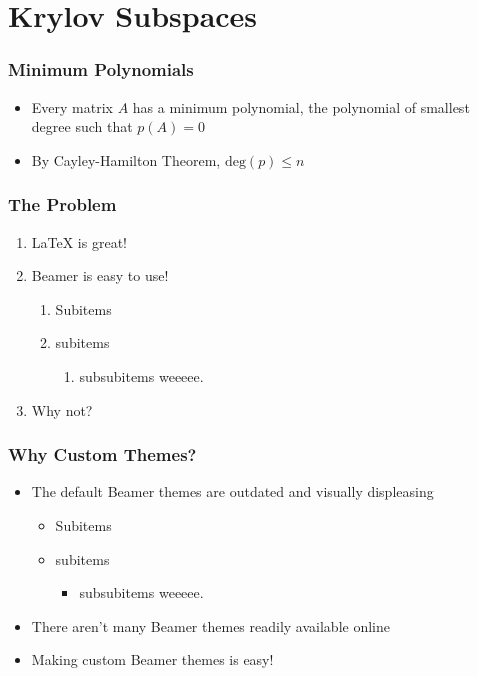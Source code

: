 \documentclass{beamer}
\begin{document}
    \section{Krylov Subspaces}
    \begin{frame}
      \frametitle{Minimum Polynomials}
      \begin{itemize}
        \item Every matrix $A$ has a minimum polynomial, the polynomial of smallest degree such that $p\left( A \right) = 0$
        \item By Cayley-Hamilton Theorem, $\text{deg}\left( p \right) \leq n$
      \end{itemize}
    \end{frame}

		\begin{frame}
			\frametitle{The Problem}
			\begin{enumerate}
				\item LaTeX is great!
				\item Beamer is easy to use!
          \begin{enumerate}
            \item Subitems
            \item subitems
            \begin{enumerate}
              \item subsubitems weeeee.
            \end{enumerate}
          \end{enumerate}
				\item Why not?
			\end{enumerate}
		\end{frame}

		\begin{frame}
			\frametitle{Why Custom Themes?}
			\begin{itemize}
				\item The default Beamer themes are outdated and visually displeasing
          \begin{itemize}
            \item Subitems
            \item subitems
            \begin{itemize}
              \item subsubitems weeeee.
            \end{itemize}
          \end{itemize}
				\item There aren't many Beamer themes readily available online
				\item Making custom Beamer themes is easy!
			\end{itemize}
		\end{frame}
\end{document}
